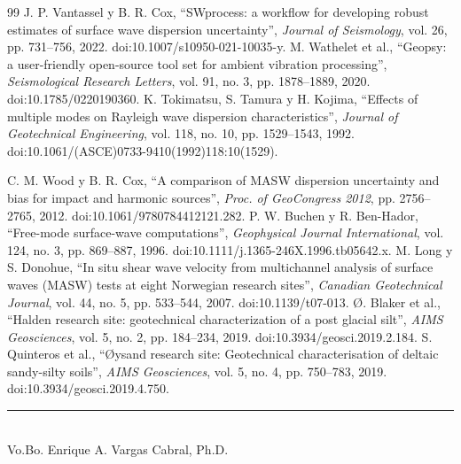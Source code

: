 \documentclass[11pt,a4paper]{article}
\newcommand{\tutor}{Enrique A. Vargas Cabral, Ph.D.}
\begin{document}
\begin{thebibliography}{99}
 J. P. Vantassel y B. R. Cox, ``SWprocess: a workflow for developing robust estimates of surface wave dispersion uncertainty'', \textit{Journal of Seismology}, vol. 26, pp. 731--756, 2022. doi:10.1007/s10950-021-10035-y.
 M. Wathelet et al., ``Geopsy: a user-friendly open-source tool set for ambient vibration processing'', \textit{Seismological Research Letters}, vol. 91, no. 3, pp. 1878--1889, 2020. doi:10.1785/0220190360.
 K. Tokimatsu, S. Tamura y H. Kojima, ``Effects of multiple modes on Rayleigh wave dispersion characteristics'', \textit{Journal of Geotechnical Engineering}, vol. 118, no. 10, pp. 1529--1543, 1992. doi:10.1061/(ASCE)0733-9410(1992)118:10(1529).

 C. M. Wood y B. R. Cox, ``A comparison of MASW dispersion uncertainty and bias for impact and harmonic sources'', \textit{Proc. of GeoCongress 2012}, pp. 2756--2765, 2012. doi:10.1061/9780784412121.282.
 P. W. Buchen y R. Ben-Hador, ``Free-mode surface-wave computations'', \textit{Geophysical Journal International}, vol. 124, no. 3, pp. 869--887, 1996. doi:10.1111/j.1365-246X.1996.tb05642.x.
 M. Long y S. Donohue, ``In situ shear wave velocity from multichannel analysis of surface waves (MASW) tests at eight Norwegian research sites'', \textit{Canadian Geotechnical Journal}, vol. 44, no. 5, pp. 533--544, 2007. doi:10.1139/t07-013.
 \O. Blaker et al., ``Halden research site: geotechnical characterization of a post glacial silt'', \textit{AIMS Geosciences}, vol. 5, no. 2, pp. 184--234, 2019. doi:10.3934/geosci.2019.2.184.
 S. Quinteros et al., ``\O{}ysand research site: Geotechnical characterisation of deltaic sandy-silty soils'', \textit{AIMS Geosciences}, vol. 5, no. 4, pp. 750--783, 2019. doi:10.3934/geosci.2019.4.750.
\end{thebibliography}

\vspace{0.15em}
\begin{flushright}
\rule{6.0cm}{0.4pt}\\[-0.1em]
{\small Vo.Bo. \tutor}
\end{flushright}
\end{document}
